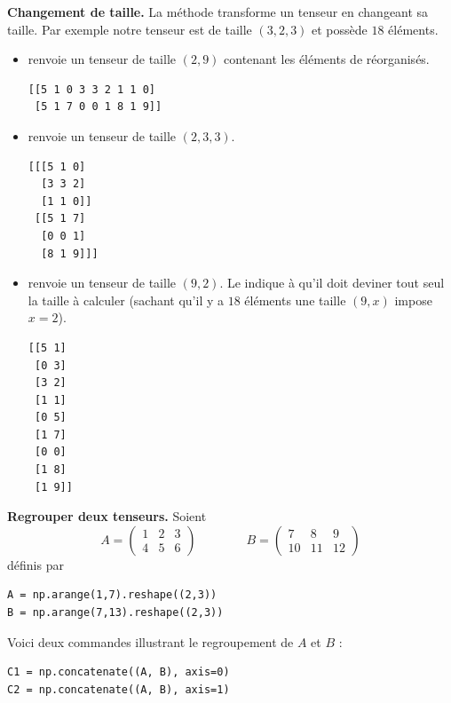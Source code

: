 \documentclass[11pt,class=report,crop=false]{standalone}
\begin{document}
\textbf{Changement de taille.}
La méthode  transforme un tenseur en changeant sa taille.
Par exemple notre tenseur  est de taille $(3,2,3)$ et possède $18$ éléments.
\begin{itemize}
  \item {} renvoie un tenseur de taille $(2,9)$ contenant les éléments de  réorganisés.

\begin{center}
\begin{minipage}{0.5\textwidth}  
\begin{lstlisting}
[[5 1 0 3 3 2 1 1 0]
 [5 1 7 0 0 1 8 1 9]]  
\end{lstlisting}
\end{minipage}
\end{center}
  
  \item {} renvoie un tenseur de taille $(2,3,3)$.
\begin{center}
\begin{minipage}{0.5\textwidth}    
\begin{lstlisting}
[[[5 1 0]
  [3 3 2]
  [1 1 0]]
 [[5 1 7]
  [0 0 1]
  [8 1 9]]]      
\end{lstlisting}
\end{minipage}
\end{center}  
  \item {} renvoie un tenseur de taille $(9,2)$. Le \og{}\fg{} indique à \Python{} qu'il doit deviner tout seul la taille à calculer (sachant qu'il y a $18$ éléments une taille $(9,x)$ impose $x=2$).
\begin{center}
\begin{minipage}{0.5\textwidth}    
\begin{lstlisting}
[[5 1]
 [0 3]
 [3 2]
 [1 1]
 [0 5]
 [1 7]
 [0 0]
 [1 8]
 [1 9]]  
\end{lstlisting}  
\end{minipage}
\end{center}
  
\end{itemize}



\textbf{Regrouper deux tenseurs.}
Soient 
$$A = \begin{pmatrix}
1 & 2 & 3 \\
4 & 5 & 6
\end{pmatrix}
\qquad\qquad
B = \begin{pmatrix}
 7 &  8 &  9 \\
10 & 11 & 12
\end{pmatrix}
$$
définis par
\begin{lstlisting}
A = np.arange(1,7).reshape((2,3))
B = np.arange(7,13).reshape((2,3))
\end{lstlisting}
Voici deux commandes illustrant le regroupement de $A$ et $B$ : 
\begin{lstlisting}
C1 = np.concatenate((A, B), axis=0)
C2 = np.concatenate((A, B), axis=1)
\end{lstlisting}
\end{document}
